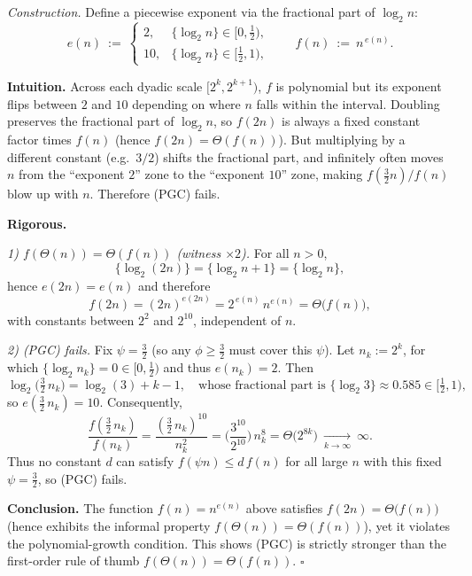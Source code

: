 \documentclass[12pt]{article}
\theoremstyle{definition}
\begin{document}
\medskip
\noindent\textit{Construction.}
Define a piecewise exponent via the fractional part of $\log_2 n$:
\[
e(n)\ :=\ \begin{cases}
2, & \{\log_2 n\}\in[0,\tfrac12),\\[2mm]
10,& \{\log_2 n\}\in[\tfrac12,1),
\end{cases}
\qquad
f(n)\ :=\ n^{\,e(n)}.
\]

\medskip
\noindent\textbf{Intuition.}
Across each dyadic scale $[2^k,2^{k+1})$, $f$ is polynomial but its exponent flips
between $2$ and $10$ depending on where $n$ falls within the interval.
Doubling preserves the fractional part of $\log_2 n$, so $f(2n)$ is always a fixed
constant factor times $f(n)$ (hence $f(2n)=\Theta(f(n))$).  But multiplying by a
different constant (e.g.\ $3/2$) shifts the fractional part, and infinitely often
moves $n$ from the ``exponent $2$'' zone to the ``exponent $10$'' zone, making
$f(\tfrac32 n)/f(n)$ blow up with $n$.  Therefore (PGC) fails.

\medskip
\noindent\textbf{Rigorous.}

\emph{1) $f(\Theta(n))=\Theta(f(n))$ (witness $\times 2$).}
For all $n>0$,
\[
\{\log_2(2n)\}=\{\log_2 n+1\}=\{\log_2 n\},
\]
hence $e(2n)=e(n)$ and therefore
\[
f(2n)=(2n)^{e(2n)}=2^{\,e(n)}\,n^{e(n)}=\Theta\!\big(f(n)\big),
\]
with constants between $2^2$ and $2^{10}$, independent of $n$.

\smallskip
\emph{2) (PGC) fails.}
Fix $\psi=\tfrac32$ (so any $\phi\ge \tfrac32$ must cover this $\psi$).
Let $n_k:=2^{k}$, for which $\{\log_2 n_k\}=0\in[0,\tfrac12)$ and thus $e(n_k)=2$.
Then
\[
\log_2\!\big(\tfrac32\,n_k\big)=\log_2(3)+k-1,
\quad\text{whose fractional part is }\{\log_2 3\}\approx 0.585\in[\tfrac12,1),
\]
so $e(\tfrac32\,n_k)=10$. Consequently,
\[
\frac{f(\tfrac32\,n_k)}{f(n_k)}
=\frac{(\tfrac32\,n_k)^{10}}{n_k^{2}}
=\Big(\frac{3^{10}}{2^{10}}\Big)\,n_k^{8}
= \Theta\!\big(2^{8k}\big)\ \xrightarrow[k\to\infty]{}\ \infty.
\]
Thus no constant $d$ can satisfy $f(\psi n)\le d\,f(n)$ for all large $n$ with this
fixed $\psi=\tfrac32$, so (PGC) fails.

\medskip
\noindent\textbf{Conclusion.}
The function $f(n)=n^{e(n)}$ above satisfies $f(2n)=\Theta\!\big(f(n)\big)$ (hence
exhibits the informal property $f(\Theta(n))=\Theta(f(n))$), yet it violates the
polynomial-growth condition.  This shows (PGC) is strictly stronger than the
first-order rule of thumb $f(\Theta(n))=\Theta(f(n))$.
\hfill$\square$

\newpage
\end{document}
